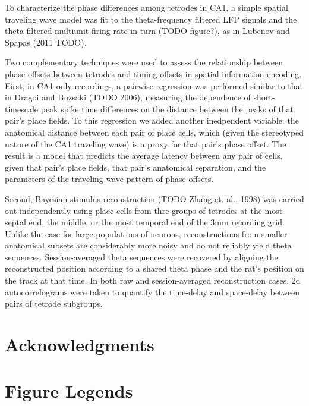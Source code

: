 \documentclass[10pt]{article}
\begin{document}
To characterize the phase differences among tetrodes in CA1, a simple spatial traveling wave model was fit to the theta-frequency filtered LFP signals and the theta-filtered multiunit firing rate in turn (TODO figure?), as in Lubenov and Spapas (2011 TODO).

Two complementary techniques were used to assess the relationship between phase offsets between tetrodes and timing offsets in spatial information encoding. First, in CA1-only recordings, a pairwise regression was performed similar to that in Dragoi and Buzsaki (TODO 2006), measuring the dependence of short-timescale peak spike time differences on the distance between the peaks of that pair's place fields. To this regression we added another inedpendent variable: the anatomical distance between each pair of place cells, which (given the stereotyped nature of the CA1 traveling wave) is a proxy for that pair's phase offset. The result is a model that predicts the average latency between any pair of cells, given that pair's place fields, that pair's anatomical separation, and the parameters of the traveling wave pattern of phase offsets.

Second, Bayesian stimulus reconstruction (TODO Zhang et. al., 1998) was carried out independently using place cells from thre groups of tetrodes at the most septal end, the middle, or the most temporal end of the 3mm recording grid. Unlike the case for large populations of neurons, reconstructions from smaller anatomical subsets are considerably more noisy and do not reliably yield theta sequences. Session-averaged theta sequences were recovered by aligning the reconstructed position according to a shared theta phase and the rat's position on the track at that time. In both raw and session-averaged reconstruction cases, 2d autocorrelograms were taken to quantify the time-delay and space-delay between pairs of tetrode subgroups.


\section*{Acknowledgments}




\section*{Figure Legends}
\end{document}

